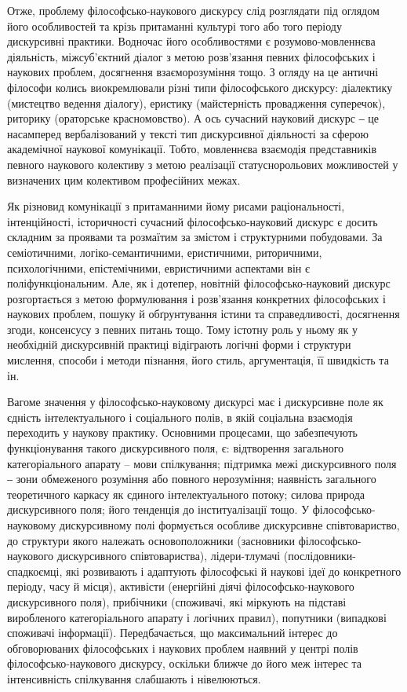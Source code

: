 Отже, проблему філософсько-наукового дискурсу слід розглядати під
оглядом його особливостей та крізь притаманні культурі того або того періоду
дискурсивні практики. Водночас його особливостями є розумово-мовленнєва
діяльність, міжсуб’єктний діалог з метою розв’язання певних філософських і
наукових проблем, досягнення взаєморозуміння тощо. З огляду на це античні
філософи колись виокремлювали різні типи філософського дискурсу:
діалектику (мистецтво ведення діалогу), еристику (майстерність провадження
суперечок), риторику (ораторське красномовство). А ось сучасний науковий
дискурс ‒ це насамперед вербалізований у тексті тип дискурсивної діяльності за
сферою академічної наукової комунікації. Тобто, мовленнєва взаємодія
представників певного наукового колективу з метою реалізації статуснорольових можливостей у визначених цим колективом професійних межах.

Як різновид комунікації з притаманними йому рисами раціональності,
інтенційності, історичності сучасний філософсько-науковий дискурс є досить
складним за проявами та розмаїтим за змістом і структурними побудовами. За
семіотичними, логіко-семантичними, еристичними, риторичними,
психологічними, епістемічними, евристичними аспектами він є
поліфункціональним. Але, як і дотепер, новітній філософсько-науковий
дискурс розгортається з метою формулювання і розв’язання конкретних
філософських і наукових проблем, пошуку й обґрунтування істини та
справедливості, досягнення згоди, консенсусу з певних питань тощо. Тому
істотну роль у ньому як у необхідній дискурсивній практиці відіграють логічні 
форми і структури мислення, способи і методи пізнання, його стиль,
аргументація, її швидкість та ін.

Вагоме значення у філософсько-науковому дискурсі має і дискурсивне поле
як єдність інтелектуального і соціального полів, в якій соціальна взаємодія
переходить у наукову практику. Основними процесами, що забезпечують
функціонування такого дискурсивного поля, є: відтворення загального
категоріального апарату – мови спілкування; підтримка межі дискурсивного
поля ‒ зони обмеженого розуміння або повного нерозуміння; наявність
загального теоретичного каркасу як єдиного інтелектуального потоку; силова
природа дискурсивного поля; його тенденція до інституалізації тощо. У
філософсько-науковому дискурсивному полі формується особливе дискурсивне
співтовариство, до структури якого належать основоположники (засновники
філософсько-наукового дискурсивного співтовариства), лідери-тлумачі
(послідовники-спадкоємці, які розвивають і адаптують філософські й наукові
ідеї до конкретного періоду, часу й місця), активісти (енергійні діячі
філософсько-наукового дискурсивного поля), прибічники (споживачі, які
міркують на підставі виробленого категоріального апарату і логічних правил),
попутники (випадкові споживачі інформації). Передбачається, що
максимальний інтерес до обговорюваних філософських і наукових проблем
наявний у центрі полів філософсько-наукового дискурсу, оскільки ближче до
його меж інтерес та інтенсивність спілкування слабшають і нівелюються.

